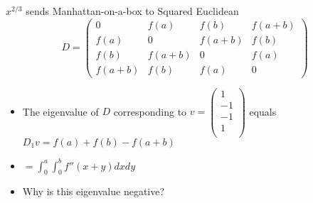  
 \begin{frame}{$x^{2/3}$ sends Manhattan-on-a-box to Squared Euclidean}
   \[ D = \begin{pmatrix}
   0 & f(a) & f(b) & f(a+b)\\
   f(a) & 0 & f(a+b) & f(b)\\
   f(b) & f(a+b) & 0 & f(a)\\
   f(a+b) & f(b) & f(a) & 0
   \end{pmatrix}
   \]
   \begin{itemize}[<+->]
   \item The eigenvalue of $D$ corresponding to $
   v = \begin{pmatrix} 1 \\
   -1\\
   -1 \\
   1\\
   \end{pmatrix}$
   equals
   $D_1v = f(a) + f(b) -f(a+b)$
   \item $= \int_0^a \int_0^b f''(x+y) dx dy$
   \item Why is this eigenvalue negative?
   \end{itemize}
 \end{frame}
 

